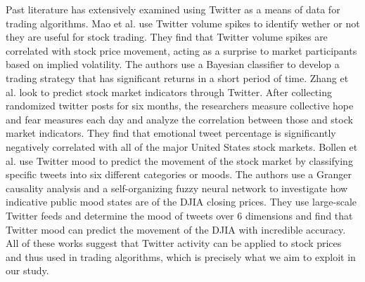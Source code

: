 \documentclass[../thesis.tex]{subfiles}
\begin{document}
Past literature has extensively examined using Twitter as a means of data for trading algorithms. Mao et al. \cite{Mao2013} use Twitter volume spikes to identify wether or not they are useful for stock trading. They find that Twitter volume spikes are correlated with stock price movement, acting as a surprise to market participants based on implied volatility. The authors use a Bayesian classifier to develop a trading strategy that has significant returns in a short period of time. Zhang et al. \cite{Zhang2011} look to predict stock market indicators through Twitter. After collecting randomized twitter posts for six months, the researchers measure collective hope and fear measures each day and analyze the correlation between those and stock market indicators. They find that emotional tweet percentage is significantly negatively correlated with all of the major United States stock markets. Bollen et al. \cite{Bollen} use Twitter mood to predict the movement of the stock market by classifying specific tweets into six different categories or moods. The authors use a Granger causality analysis and a self-organizing fuzzy neural network to investigate how indicative public mood states are of the DJIA closing prices. They use large-scale Twitter feeds and determine the mood of tweets over 6 dimensions and find that Twitter mood can predict the movement of the DJIA with incredible accuracy. All of these works suggest that Twitter activity can be applied to stock prices and thus used in trading algorithms, which is precisely what we aim to exploit in our study. 
\end{document}
